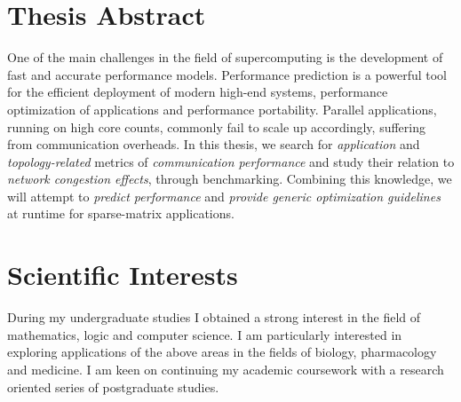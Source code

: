 \documentclass[a4paper,10pt]{article}
\begin{document}
\section{Thesis Abstract}
One of the main challenges in the field of supercomputing is the
development of fast and accurate performance models.
Performance prediction is a powerful tool for the efficient deployment of
modern high-end systems, performance optimization of applications and
performance portability. Parallel applications, running
on high core counts, commonly fail to scale up accordingly,
suffering from communication overheads. In this thesis,
we search for \emph{application} and \emph{topology-related}
metrics of \emph{communication performance} and study their relation
to \emph{network congestion effects}, through benchmarking. Combining
this knowledge, we will attempt to \emph{predict performance} and \emph{provide
generic optimization guidelines} at runtime for sparse-matrix applications.

\section{Scientific Interests}
During my undergraduate studies I obtained a strong interest in the field of mathematics, logic and computer science. I am particularly interested in exploring applications of the above areas in the fields of biology, pharmacology and medicine. I am keen on continuing my academic coursework with a research oriented series of postgraduate studies.
 
\end{document}
